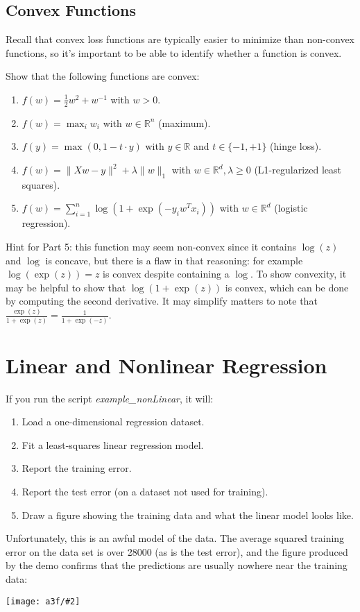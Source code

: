 \documentclass{article}
\def\blu#1{{\color{blu}#1}}
\def\norm#1{\|#1\|}
\def\R{\mathbb{R}}
\def\half{\frac 1 2}
\newcommand{\centerfig}[2]{\begin{center}\texttt{[image: a3f/\#2]}\end{center}}
\def\enum#1{\begin{enumerate}#1\end{enumerate}}
\begin{document}
\pagebreak

\subsection{Convex Functions}

Recall that convex loss functions are typically easier to minimize than non-convex functions, so it's important to be able to identify whether a function is convex.

\blu{Show that the following functions are convex}:

\enum{
\item $f(w) = \half w^2 + w^{-1}$ with $w > 0$.
\item $f(w) = \max_i w_i$ with $w \in \R^n$ (maximum).
\item $f(y) = \max(0,1-t\cdot y)$ with $y\in \R$ and $t\in\{-1,+1\}$ (hinge loss).
\item $f(w) = \norm{Xw-y}^2 + \lambda\norm{w}_1$ with $w \in \R^d, \lambda \geq 0$ (L1-regularized least squares).
\item $f(w) = \sum_{i=1}^n \log(1+\exp(-y_iw^Tx_i)) $ with $w \in \R^d$ (logistic regression).
}

Hint for Part 5:
this function may seem non-convex since it contains $\log(z)$ and $\log$ is concave, but there is a flaw in that reasoning: for example $\log(\exp(z))=z$ is convex despite containing a $\log$. To show convexity, it may be helpful to show that $\log(1+\exp(z))$ is convex, which can be done by computing the second derivative. It may simplify matters to note that $\frac{\exp(z)}{1+\exp(z)} = \frac{1}{1+\exp(-z)}$.

\pagebreak

\section{Linear and Nonlinear Regression}


If you run the script \emph{example\_nonLinear}, it will:
\enum{
\item Load a one-dimensional regression dataset.
\item Fit a least-squares linear regression model.
\item Report the training error.
\item Report the test error (on a dataset not used for training).
\item Draw a figure showing the training data and what the linear model looks like.
}
Unfortunately, this is an awful model of the data. The average squared training error on the data set is over 28000 (as is the test error), and the figure produced by the demo confirms that the predictions are usually nowhere near the training data:
\centerfig{.5}{leastSquares}
\end{document}
